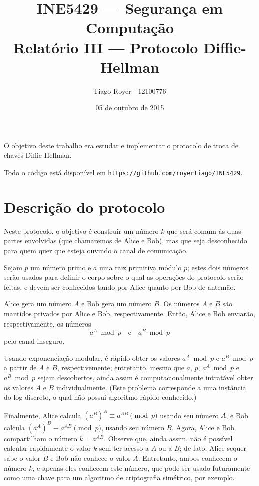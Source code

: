 \documentclass{article}
\title{
    INE5429 --- Segurança em Computação \\
    Relatório III --- Protocolo Diffie-Hellman
}
\author{
    Tiago Royer - 12100776
}
\date{05 de outubro de 2015}
\begin{document}
\maketitle

O objetivo deste trabalho era estudar e implementar
o protocolo de troca de chaves Diffie-Hellman.

Todo o código está disponível em \verb"https://github.com/royertiago/INE5429".

\section{Descrição do protocolo}

Neste protocolo,
o objetivo é construir um número $k$ que será comum às duas partes envolvidas
(que chamaremos de Alice e Bob),
mas que seja desconhecido para quem quer que esteja ouvindo o canal de comunicação.

Sejam $p$ um número primo e $a$ uma raiz primitiva módulo $p$;
estes dois números serão usados para definir o corpo sobre o qual
as operações do protocolo serão feitas,
e devem ser conhecidos tando por Alice quanto por Bob de antemão.

Alice gera um número $A$ e Bob gera um número $B$.
Os números $A$ e $B$ são mantidos privados por Alice e Bob,
respectivamente.
Então, Alice e Bob enviarão,
respectivamente, os números
\begin{equation*}
    a^A \bmod p \quad \text{e} \quad a^B \bmod p
\end{equation*}
pelo canal inseguro.

Usando exponenciação modular,
é rápido obter os valores $a^A \bmod p$ e $a^B \bmod p$
a partir de $A$ e $B$, respectivemente;
entretanto,
mesmo que $a$, $p$, $a^A \bmod p$ e $a^B \bmod p$ sejam descobertos,
ainda assim é computacionalmente intratável
obter os valores $A$ e $B$ individualmente.
(Este problema corresponde a uma instância do log discreto,
o qual não possui algoritmo rápido conhecido.)

Finalmente, Alice calcula $(a^B)^A \equiv a^{AB} \pmod p$
usando seu número $A$,
e Bob calcula $(a^A)^B \equiv a^{AB} \pmod p$,
usando seu número $B$.
Agora,
Alice e Bob compartilham o número $k = a^{AB}$.
Observe que, ainda assim,
não é possível calcular rapidamente o valor $k$ sem ter acesso a $A$ ou a $B$;
de fato, Alice sequer sabe o valor $B$
e Bob não conhece o valor $A$.
Entretanto,
ambos conhecem o número $k$,
e apenas eles conhecem este número,
que pode ser usado futuramente como uma chave
para um algoritmo de criptografia simétrico, por exemplo.
\end{document}
